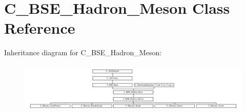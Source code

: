 \hypertarget{class_c___b_s_e___hadron___meson}{\section{C\-\_\-\-B\-S\-E\-\_\-\-Hadron\-\_\-\-Meson Class Reference}
\label{class_c___b_s_e___hadron___meson}
}
Inheritance diagram for C\-\_\-\-B\-S\-E\-\_\-\-Hadron\-\_\-\-Meson\-:\begin{figure}[H]
\begin{center}
\leavevmode
\includegraphics[height=2.470588cm]{class_c___b_s_e___hadron___meson}
\end{center}
\end{figure}
